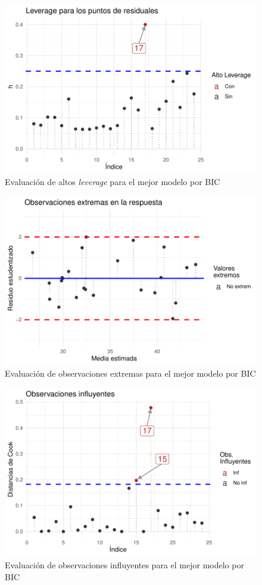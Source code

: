 \documentclass[
]{article}
\begin{document}
\begin{figure}
\centering
\includegraphics{diagnosticorrpp_files/figure-latex/residuals LEVERAGE para mejor modelo por BIC-1.pdf}
\caption{Evaluación de altos \emph{leverage} para el mejor modelo por
BIC}
\end{figure}

\begin{figure}
\centering
\includegraphics{diagnosticorrpp_files/figure-latex/observaciones EXTREMAS para mejor modelo por BIC-1.pdf}
\caption{Evaluación de observaciones extremas para el mejor modelo por
BIC}
\end{figure}

\begin{figure}
\centering
\includegraphics{diagnosticorrpp_files/figure-latex/observaciones influyentes para mejor modelo por BIC-1.pdf}
\caption{Evaluación de observaciones influyentes para el mejor modelo
por BIC}
\end{figure}
\end{document}
